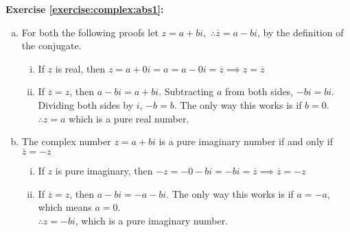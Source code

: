 \noindent\textbf{Exercise \ref{exercise:complex:abs1}:}  %
\begin{enumerate}[(a)]
\item
For both the following proofs let $z = a + bi$,\ $\therefore \overline{z} = a - bi$, by the definition of the conjugate.
        \begin{enumerate}[i.]
            \item 
            If $z$ is real, then $z = a + 0i = a = a - 0i = \overline{z}\implies z = \overline{z}$
            \item 
            If $\overline{z} = z$, then $a - bi = a + bi$. Subtracting $a$ from both sides, $-bi = bi$. Dividing both sides by $i$, $-b = b$. The only way this works is if $b=0$.\\
            $\therefore z=a$ which is a pure real number.
        \end{enumerate}
 
\item
The complex number $z = a + bi$ is a pure imaginary number if and only if $\overline{z} = -z$
        \begin{enumerate}[i.]
            \item
            If $z$ is pure imaginary, then $-z = -0 - bi = - bi = \overline{z}\implies \overline{z} = -z$
            \item
             If $\overline{z} = z$, then $a - bi = -a - bi$. The only way this works is if $a = -a$, which means $a=0$.\\
            $\therefore z = -bi$, which is a pure imaginary number.
        \end{enumerate}
\end{enumerate}
 
